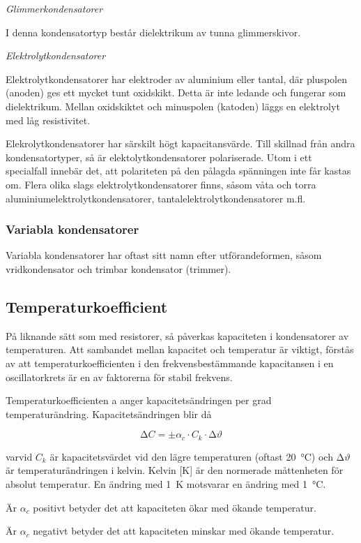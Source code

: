 \emph{Glimmerkondensatorer}

I denna kondensatortyp består dielektrikum av tunna glimmerskivor.

\emph{Elektrolytkondensatorer}

Elektrolytkondensatorer har elektroder av aluminium eller tantal, där pluspolen
(anoden) ges ett mycket tunt oxidskikt. Detta är inte ledande och fungerar som
dielektrikum. Mellan oxidskiktet och minuspolen (katoden) läggs en elektrolyt
med låg resistivitet.

Elekrolytkondensatorer har särskilt högt kapacitansvärde. Till skillnad från
andra kondensatortyper, så är elektolytkondensatorer polariserade. Utom i ett
specialfall innebär det, att polariteten på den pålagda spänningen inte får
kastas om. Flera olika slags elektrolytkondensatorer finns, såsom våta
och torra aluminiumelektrolytkondensatorer, tantalelektrolytkondensatorer m.fl.

\subsubsection{Variabla kondensatorer}
Variabla kondensatorer har oftast sitt namn efter utförandeformen, såsom
vridkondensator och trimbar kondensator (trimmer).

\subsection{Temperaturkoefficient}

På liknande sätt som med resistorer, så påverkas kapaciteten i kondensatorer av
temperaturen. Att sambandet mellan kapacitet och temperatur är viktigt, förstås
av att temperaturkoefficienten i den frekvensbestämmande kapacitansen i en
oscillatorkrets är en av faktorerna för stabil frekvens.

Temperaturkoefficienten a anger kapacitetsändringen per grad temperaturändring.
Kapacitetsändringen blir då

\[∆C = \pm \alpha _c \cdot C_k \cdot ∆\vartheta\]

varvid \(C_k\) är kapacitetsvärdet vid den lägre temperaturen (oftast 20~°C) och
\(∆\vartheta\) är temperaturändringen i kelvin.
Kelvin [K] är den normerade måttenheten för absolut temperatur.
En ändring med 1~K motsvarar en ändring med 1~°C.

Är \(\alpha _c\) positivt betyder det att kapaciteten ökar med ökande
temperatur.

Är \(\alpha _c\) negativt betyder det att kapaciteten minskar med ökande
temperatur.


